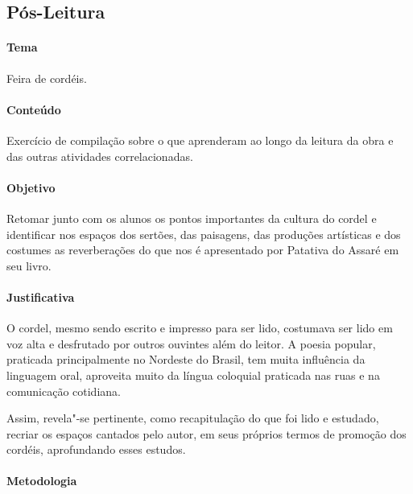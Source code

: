 \documentclass[12pt]{extarticle}
\begin{document}

\subsection{Pós-Leitura}

\paragraph{Tema} Feira de cordéis.

\paragraph{Conteúdo} Exercício de compilação sobre o que aprenderam ao 
longo da leitura da obra e das outras atividades correlacionadas. 

\paragraph{Objetivo} Retomar junto com os alunos os pontos importantes 
da cultura do cordel e identificar nos espaços dos sertões, das paisagens, 
das produções artísticas e dos costumes as reverberações do que nos 
é apresentado por Patativa do Assaré em seu livro. 

\paragraph{Justificativa} O cordel, mesmo sendo escrito e impresso para 
ser lido, costumava ser lido em voz alta e desfrutado por outros ouvintes
além do leitor. A poesia popular, praticada principalmente
no Nordeste do Brasil, tem muita influência da linguagem
oral, aproveita muito da língua coloquial praticada nas ruas
e na comunicação cotidiana.

Assim, revela"-se pertinente, como recapitulação do que foi lido e 
estudado, recriar os espaços cantados pelo autor, em seus próprios termos 
de promoção dos cordéis, aprofundando esses estudos.

\paragraph{Metodologia}
\end{document}
